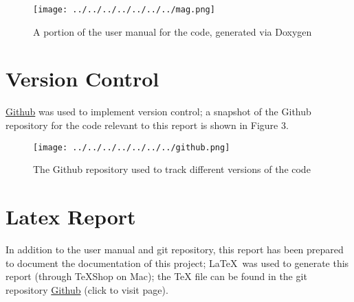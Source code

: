 \documentclass[11pt]{article}
\begin{document}
\begin{figure}[h]
\centering
\texttt{[image: ../../../../../../../mag.png]}
\caption{A portion of the user manual for the code, generated via Doxygen}
\end{figure}

\section{Version Control}
\href{https://github.com/Parham2000/ASTE-404-Test.git}{Github} was used to implement version control; a snapshot of the Github repository for the code relevant to this report is shown in Figure 3.

\begin{figure}[h]
\centering
\texttt{[image: ../../../../../../../github.png]}
\caption{The Github repository used to track different versions of the code}
\end{figure}

\section{Latex Report}
In addition to the user manual and git repository, this report has been prepared to document the documentation of this project; \LaTeX\ was used to generate this report (through TeXShop on Mac); the TeX file can be found in the git repository \href{https://github.com/Parham2000/ASTE-404-Test.git}{Github} (click to visit page).
\end{document}
